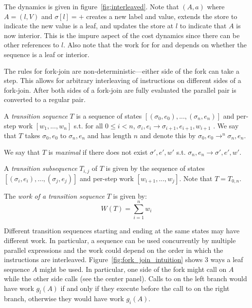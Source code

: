 The dynamics is given in figure~\ref{fig:interleaved}.  Note that
\set$(A,a)$ where $A = (l,V)$ and $\sigma[l] = +$ creates a new label and
value, extends the store to indicate the new value is a leaf, and
updates the store at $l$ to indicate that $A$ is now interior.  This
is the impure aspect of the cost dynamics since there can be other
references to $l$.  Also note that the work for for \get{} and \set{}
depends on whether the sequence is a leaf or interior.

The rules for fork-join are non-deterministic---either side of the
fork can take a step.  This allows for arbitrary interleaving of
instructions on different sides of a fork-join.  After both sides of a
fork-join are fully evaluated the parallel pair is converted to a regular pair.

\begin{definition}
A \emph{transition sequence} $T$ is a sequence of states $[(\sigma_0, e_0),
..., (\sigma_n, e_n)]$ and per-step work $[w_1, ..., w_n]$ s.t. for all $0 \leq i < n$, $\sigma_i, e_i \to \sigma_{i+1}, e_{i+1}, w_{i+1}$ . We say that $T$ takes $\sigma_0, e_0$ to $\sigma_n, e_n$ and has length $n$ and denote this by $\sigma_0, e_0 \to^n \sigma_n, e_n$.
\end{definition}

\begin{definition}
We say that $T$ is \emph{maximal} if there does not exist $\sigma', e', w'$ s.t. $\sigma_n, e_n \to \sigma', e', w'$.
\end{definition}

\begin{definition}
A \emph{transition subsequence} $T_{i, j}$ of $T$ is given by the
sequence of states $[(\sigma_i, e_i), ..., (\sigma_j, e_j)]$ and per-step work
$[w_{i+1}, ..., w_j]$. Note that $T = T_{0,n}$.   
\end{definition}

\begin{definition}
The \emph{work of a transition sequence} $T$ is given by:
$$W(T) = \sum_{i=1}^n w_i$$
\end{definition}

Different transition sequences starting and ending at the same states
may have different work.  In particular, a sequence can be used
concurrently by multiple parallel expressions and the work could
depend on the order in which the instructions are interleaved.
Figure~\ref{fig:fork_join_intuition} shows 3 ways a leaf sequence $A$
might be used.  In particular, one side of the fork might call \get{}
on $A$ while the other side calls \set{} (see the center panel). Calls
to \get{} on the left branch would have work $g_l(A)$ if and only if
they execute before the call to \set{} on the right branch, otherwise
they would have work $g_i(A)$.

